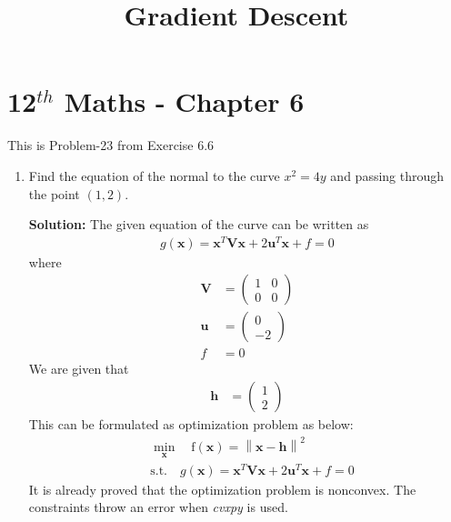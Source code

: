 \documentclass[12pt]{article}
\providecommand{\brak}[1]{\ensuremath{\left(#1\right)}}
\providecommand{\norm}[1]{\left\lVert#1\right\rVert}
\newcommand{\solution}{\noindent \textbf{Solution: }}
\newcommand{\myvec}[1]{\ensuremath{\begin{pmatrix}#1\end{pmatrix}}}
\let\vec\mathbf
\begin{document}
\begin{center}
	\title{\textbf{Gradient Descent}}
\date{\vspace{-5ex}} %
\maketitle
\end{center}
\setcounter{page}{1}

\section{12$^{th}$ Maths - Chapter 6}
This is Problem-23 from Exercise 6.6 
\begin{enumerate}
	\item Find the equation of the normal to the curve $x^2=4y$ and passing through the point $(1,2)$.

\solution 
The given equation of the curve can be written as  
\begin{align}
	\label{eq:parabolaEq2}
	g\brak{\vec{x}} = \vec{x}^T\vec{V}\vec{x} + 2\vec{u}^T\vec{x} + f = 0 
\end{align}
where
\begin{align}
	\label{eq:eqV}
	\vec{V} &= \myvec{ 1 & 0 \\ 0 & 0} \\
	\label{eq:eqU}
	\vec{u} &= \myvec{0 \\ -2} \\
	\label{eq:eqF}
	f &= 0 
\end{align}
We are given that 
\begin{align}
	\vec{h} &= \myvec{1 \\ 2}
\end{align}
This can be formulated as optimization problem as below:
\begin{align}
	\label{eq:Eq3}
	&  \min_{\vec{x}} \quad \text{f}\brak{\vec{x}} = \norm{\vec{x}-\vec{h}}^2\\
	\label{eq:Eq4}
	& \text{s.t.}\quad g\brak{\vec{x}} = \vec{x}^T\vec{V}\vec{x} + 2\vec{u}^T\vec{x} + f = 0  
\end{align}
It is already proved that the optimization problem is nonconvex. The constraints throw an error when \textit{cvxpy} is used. 


\end{enumerate}
\end{document}

